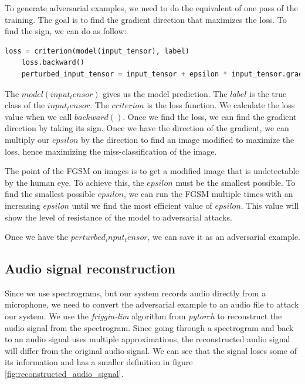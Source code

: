 To generate adversarial examples, we need to do the equivalent of one pass of the training. The goal is to find the gradient direction that maximizes the loss. To find the sign, we can do as follow:

\begin{lstlisting}[language=Python]
    loss = criterion(model(input_tensor), label)
    loss.backward()
    perturbed_input_tensor = input_tensor + epsilon * input_tensor.grad.sign()
\end{lstlisting}

The $model(input_tensor)$ gives us the model prediction. The $label$ is the true class of the $input_tensor$. The $criterion$ is the loss function. We calculate the loss value when we call $backward()$. Once we find the loss, we can find the gradient direction by taking its sign. Once we have the direction of the gradient, we can multiply our $epsilon$ by the direction to find an image modified to maximize the loss, hence maximizing the miss-classification of the image.

The point of the FGSM on images is to get a modified image that is undetectable by the human eye. To achieve this, the $epsilon$ must be the smallest possible. To find the smallest possible $epsilon$, we can run the FGSM multiple times with an increasing $epsilon$ until we find the most efficient value of $epsilon$. This value will show the level of resistance of the model to adversarial attacks.

Once we have the $perturbed_input_tensor$, we can save it as an adversarial example.

\subsection{Audio signal reconstruction}

Since we use spectrograms, but our system records audio directly from a microphone, we need to convert the adversarial example to an audio file to attack our system. We use the \textit{friggin-lim} algorithm from \textit{pytorch} to reconstruct the audio signal from the spectrogram. Since going through a spectrogram and back to an audio signal uses multiple approximations, the reconstructed audio signal will differ from the original audio signal. We can see that the signal loses some of its information and has a smaller definition in figure \ref{fig:reconstructed_audio_signal}.

